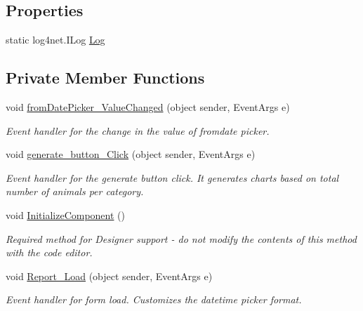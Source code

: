 \subsection*{Properties}
\begin{DoxyCompactItemize}
\item 
static log4net.\+I\+Log \hyperlink{classWildlifeTrackingApp_1_1Report_a5fc9abb86e6110ecd61d0a1a7d740a8a}{Log}
\end{DoxyCompactItemize}
\subsection*{Private Member Functions}
\begin{DoxyCompactItemize}
\item 
void \hyperlink{classWildlifeTrackingApp_1_1Report_a0f200b495bdf3a236fb9c28c94b80c3e}{from\+Date\+Picker\+\_\+\+Value\+Changed} (object sender, Event\+Args e)
\begin{DoxyCompactList}\small\item\em Event handler for the change in the value of fromdate picker. \end{DoxyCompactList}\item 
void \hyperlink{classWildlifeTrackingApp_1_1Report_a7c96e63901fb6957f166378e24e989a6}{generate\+\_\+button\+\_\+\+Click} (object sender, Event\+Args e)
\begin{DoxyCompactList}\small\item\em Event handler for the generate button click. It generates charts based on total number of animals per category. \end{DoxyCompactList}\item 
void \hyperlink{classWildlifeTrackingApp_1_1Report_a6405d5db675d5338663195a4d12b4c9f}{Initialize\+Component} ()
\begin{DoxyCompactList}\small\item\em Required method for Designer support -\/ do not modify the contents of this method with the code editor. \end{DoxyCompactList}\item 
void \hyperlink{classWildlifeTrackingApp_1_1Report_a689e29ad27d8dabef272ce565669e8d9}{Report\+\_\+\+Load} (object sender, Event\+Args e)
\begin{DoxyCompactList}\small\item\em Event handler for form load. Customizes the datetime picker format. \end{DoxyCompactList}\item 

\end{DoxyCompactItemize}
